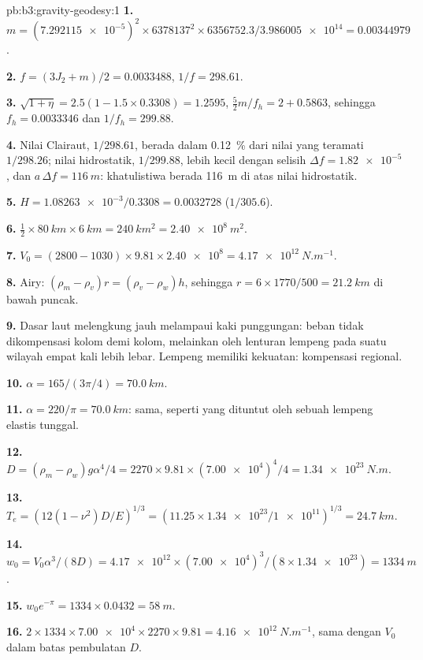 \begin{solution}{pb:b3:gravity-geodesy:1}
\textbf{1.} $m = (\num{7.292115e-5})^2\times6378137^2\times6356752.3/
\num{3.986005e14} = \num{0.00344979}$.

\textbf{2.} $f = (3J_2 + m)/2 = \num{0.0033488}$, $1/f = 298.61$.

\textbf{3.} $\sqrt{1 + \eta} = 2.5(1 - 1.5\times0.3308) = 1.2595$,
$\tfrac52m/f_h = 2 + 0.5863$, sehingga $f_h = \num{0.0033346}$ dan $1/f_h = 299.88$.

\textbf{4.} Nilai Clairaut, $1/298.61$, berada dalam \qty{0.12}{\percent} dari
nilai yang teramati $1/298.26$; nilai hidrostatik, $1/299.88$, lebih kecil dengan selisih
$\Delta f = \num{1.82e-5}$, dan $a\,\Delta f = \qty{116}{m}$: khatulistiwa
berada \qty{116}{m} di atas nilai hidrostatik.

\textbf{5.} $H = \num{1.08263e-3}/0.3308 = \num{0.0032728}$ ($1/305.6$).

\textbf{6.} $\tfrac12\times\qty{80}{km}\times\qty{6}{km} = \qty{240}{km^2} =
\qty{2.40e8}{m^2}$.

\textbf{7.} $V_0 = (2800 - 1030)\times9.81\times\num{2.40e8} =
\qty{4.17e12}{N.m^{-1}}$.

\textbf{8.} Airy: $(\rho_m - \rho_v)r = (\rho_v - \rho_w)h$, sehingga $r =
6\times1770/500 = \qty{21.2}{km}$ di bawah puncak.

\textbf{9.} Dasar laut melengkung jauh melampaui kaki punggungan: beban
tidak dikompensasi kolom demi kolom, melainkan oleh lenturan lempeng pada suatu
wilayah empat kali lebih lebar. Lempeng memiliki kekuatan: kompensasi regional.

\textbf{10.} $\alpha = 165/(3\pi/4) = \qty{70.0}{km}$.

\textbf{11.} $\alpha = 220/\pi = \qty{70.0}{km}$: sama, seperti yang dituntut oleh
sebuah lempeng elastis tunggal.

\textbf{12.} $D = (\rho_m - \rho_w)g\alpha^4/4 = 2270\times9.81\times(\num{7.00e4})^4/4
= \qty{1.34e23}{N.m}$.

\textbf{13.} $T_e = (12(1 - \nu^2)D/E)^{1/3} = (11.25\times\num{1.34e23}/
\num{1e11})^{1/3} = \qty{24.7}{km}$.

\textbf{14.} $w_0 = V_0\alpha^3/(8D) = \num{4.17e12}\times(\num{7.00e4})^3/
(8\times\num{1.34e23}) = \qty{1334}{m}$.

\textbf{15.} $w_0e^{-\pi} = 1334\times0.0432 = \qty{58}{m}$.

\textbf{16.} $2\times1334\times\num{7.00e4}\times2270\times9.81 =
\qty{4.16e12}{N.m^{-1}}$, sama dengan $V_0$ dalam batas pembulatan $D$.


\end{solution}
